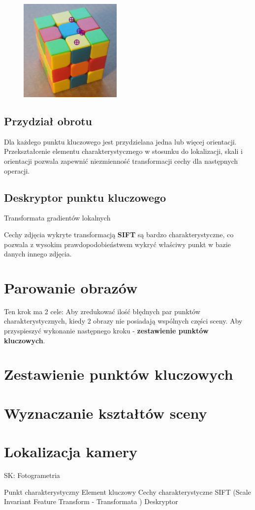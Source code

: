       \begin{figure}[h]
         \centering
         \includegraphics[width=5cm]{SIFT_cube_points.png}
         \label {fig:SIFT_points}
      \end{figure}

\subsection{Przydział obrotu}
      Dla każdego punktu kluczowego jest przydzielana jedna lub więcej orientacji.
      Przekształcenie elementu charakterystycznego w stosunku do lokalizacji, skali i orientacji pozwala zapewnić niezmienność transformacji cechy dla następnych operacji.
\subsection{Deskryptor punktu kluczowego}
      Transformata gradientów lokalnych

Cechy zdjęcia wykryte transformacją  \textbf{SIFT} są bardzo charakterystyczne, co pozwala z wysokim prawdopodobieństwem wykryć właściwy punkt w bazie danych innego zdjęcia.

\section{Parowanie obrazów}
Ten krok ma 2 cele:
Aby zredukować ilość błędnych par punktów charakterystycznych, kiedy 2 obrazy nie posiadają wspólnych części sceny.
Aby przyspieszyć wykonanie następnego kroku - \textbf{zestawienie punktów kluczowych}.
\section{Zestawienie punktów kluczowych}
\section{Wyznaczanie kształtów sceny}
\section{Lokalizacja kamery}




SK:
Fotogrametria

Punkt charakterystyczny
Element kluczowy
Cechy charakterystyczne
SIFT (Scale Invariant Feature Transform - Transformata )
Deskryptor
